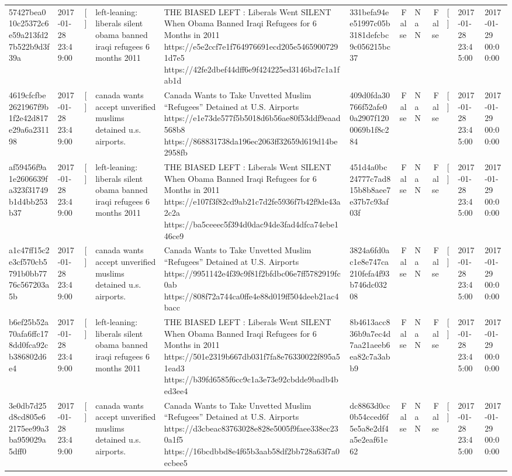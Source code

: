 \begin{tabular}{llllllrlrlll}
57427bea010c25372c6e59a213fd27b522b9d3f39a & 2017-01-28 23:49:00 & [] & left-leaning: liberals silent obama banned iraqi refugees 6 months 2011 & THE BIASED LEFT : Liberals Went SILENT When Obama Banned Iraqi Refugees for 6 Months in 2011 https://e5e2ccf7e1f764976691ecd205e54659007291d7e5 https://42fe2dbef44dff6e9f424225ed3146bd7c1a1fab1d & 331befa94ee51997c05b3181defcbc9c056215bc37 & False & NaN & False & [] & 2017-01-28 23:45:00 & 2017-01-29 00:00:00 \\
4619cfcfbe2621967f9b1f2e42d817e29a6a231198 & 2017-01-28 23:49:00 & [] & canada wants accept unverified muslims detained u.s. airports. & Canada Wants to Take Unvetted Muslim “Refugees” Detained at U.S. Airports https://e1e73de577f5b5018d6b56ae80f53ddf9eaad568b8 https://868831738da196ec2063ff32659d619d14be2958fb & 409d0fda30766f52afe00a2907f1200069b1f8c284 & False & NaN & False & [] & 2017-01-28 23:45:00 & 2017-01-29 00:00:00 \\
af59456f9a1e2606639fa323f31749b1d4bb253b37 & 2017-01-28 23:49:00 & [] & left-leaning: liberals silent obama banned iraqi refugees 6 months 2011 & THE BIASED LEFT : Liberals Went SILENT When Obama Banned Iraqi Refugees for 6 Months in 2011 https://e107f3f82cd9ab21c7d2fe5936f7b42f9de43a2c2a https://ba5ceeec5f394d0dac94de3fad4dfca74ebe146ce9 & 451d4a0bc24777c7ad815b8b8aee7e37b7c93af03f & False & NaN & False & [] & 2017-01-28 23:45:00 & 2017-01-29 00:00:00 \\
a1c47ff15c2e3cf570cb5791b0bb7776c567203a5b & 2017-01-28 23:49:00 & [] & canada wants accept unverified muslims detained u.s. airports. & Canada Wants to Take Unvetted Muslim “Refugees” Detained at U.S. Airports https://9951142e4f39c9f81f2bfdbc06e7ff5782919fc0ab https://808f72a744ca0ffe4e88d019ff504deeb21ac4bacc & 3824a6fd0ac1e8e747ca210fefa4f93b746dc03208 & False & NaN & False & [] & 2017-01-28 23:45:00 & 2017-01-29 00:00:00 \\
b6ef25b52a70afa6ffc178dd0fca92cb386802d6e4 & 2017-01-28 23:49:00 & [] & left-leaning: liberals silent obama banned iraqi refugees 6 months 2011 & THE BIASED LEFT : Liberals Went SILENT When Obama Banned Iraqi Refugees for 6 Months in 2011 https://501e2319b667db031f7fa8e76330022f895a51ead3 https://b39fd6585f6cc9c1a3e73e92cbdde9badb4bed3ee4 & 8b4613acc836b9a7ec4d7aa21aeeb6ea82c7a3abb9 & False & NaN & False & [] & 2017-01-28 23:45:00 & 2017-01-29 00:00:00 \\
3e0db7d25d8cd805e62175ee99a3ba959029a5dff0 & 2017-01-28 23:49:00 & [] & canada wants accept unverified muslims detained u.s. airports. & Canada Wants to Take Unvetted Muslim “Refugees” Detained at U.S. Airports https://d3cbeac83763028e828e5005f9faee338ec230a1f5 https://16bcdbbd8e4f65b3aab58df2bb728a63f7a0ecbee5 & dc8863d0cc0b54cced6f5e5a8e2df4a5e2eaf61e62 & False & NaN & False & [] & 2017-01-28 23:45:00 & 2017-01-29 00:00:00 \\

\end{tabular}
